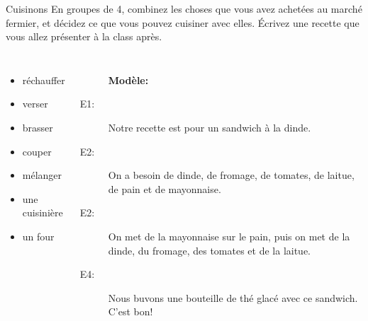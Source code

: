 \begin{frame}{Cuisinons}
  En groupes de 4, combinez les choses que vous avez achetées au marché fermier, et décidez ce que vous pouvez cuisiner avec elles.
  Écrivez une recette que vous allez présenter à la class après.
  \begin{columns}
      \begin{itemize}
        \item réchauffer 
        \item verser 
        \item brasser 
        \item couper 
        \item mélanger 
        \item une cuisinière 
        \item un four 
      \end{itemize}
      \begin{description}
        \item[] \textbf{Modèle:}
        \item[E1:] Notre recette est pour un sandwich à la dinde.
        \item[E2:] On a besoin de dinde, de fromage, de tomates, de laitue, de pain et de mayonnaise.
        \item[E2:] On met de la mayonnaise sur le pain, puis on met de la dinde, du fromage, des tomates et de la laitue.
        \item[E4:] Nous buvons une bouteille de thé glacé avec ce sandwich. C'est bon!
      \end{description}
  \end{columns}
\end{frame}